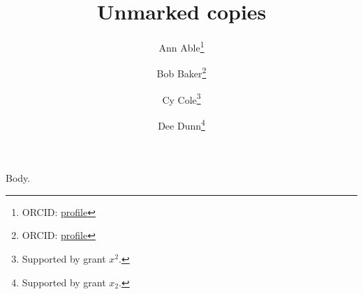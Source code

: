 \documentclass[journal]{IEEEtran}
\begin{document}
\title{Unmarked copies}
\author{Ann Able\thanks{ORCID: \href{https://orcid.org/0000-0001}{profile}}%
 \and Bob Baker\thanks{ORCID: \href{https://orcid.org/0000-0002}{profile}}%
 \and Cy Cole\thanks{Supported by grant $x^{2}$.}%
 \and Dee Dunn\thanks{Supported by grant $x_{2}$.}}
\maketitle
Body.
\end{document}
